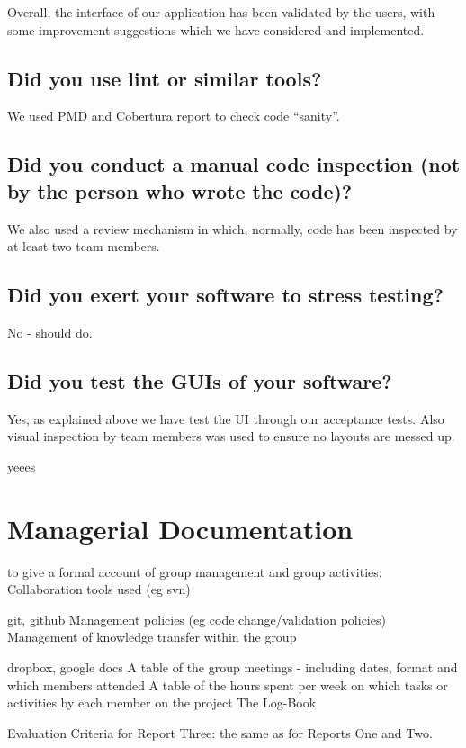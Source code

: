\documentclass[10pt]{article}
\begin{document}
Overall, the interface of our application has been validated by the users, with some improvement suggestions which we have considered and implemented.


\subsection{Did you use lint or similar tools?}

We used PMD and Cobertura report to check code ``sanity''.

\subsection{Did you conduct a manual code inspection (not by the person who wrote the code)?}

We also used a review mechanism in which, normally, code has been inspected by at least two team members.

\subsection{Did you exert your software to stress testing?}

No - should do.

\subsection{Did you test the GUIs of your software?}
Yes, as explained above we have test the UI through our acceptance tests. Also visual inspection by team members was used to ensure no layouts are messed up.

yeees

\section{Managerial Documentation}

to give a formal account of group management and group activities:
Collaboration tools used (eg svn)

git, github
Management policies (eg code change/validation policies)
Management of knowledge transfer within the group

dropbox, google docs
A table of the group meetings - including dates, format and which members attended
A table of the hours spent per week on which tasks or activities by each member on the project
The Log-Book


Evaluation Criteria for Report Three: the same as for Reports One and Two.
\end{document}
